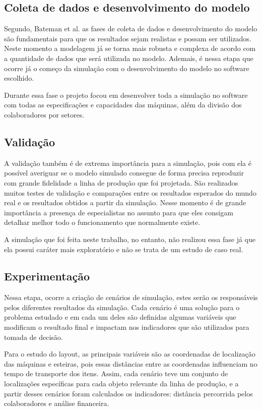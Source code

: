 \documentclass[
	12pt,				%
	openright,			%
	oneside,			%
	a4paper,			%
	english,			%
	french,				%
	spanish,			%
	brazil				%
	]{abntex2}
\begin{document}
\subsection{Coleta de dados e desenvolvimento do modelo}

Segundo, Bateman et al. as fases de coleta de dados e desenvolvimento do modelo são fundamentais para que os resultados sejam realistas e possam ser utilizados. Neste momento a modelagem já se torna mais robusta e complexa de acordo com a quantidade de dados que será utilizada no modelo. Ademais, é nessa etapa que ocorre já o começo da simulação com o desenvolvimento do modelo no software escolhido.

Durante essa fase o projeto focou em desenvolver toda a simulação no software com todas as especificações e capacidades das máquinas, além da divisão dos colaboradores por setores.



\subsection{Validação}

	A validação também é de extrema importância para a simulação, pois com ela é possível averiguar se o modelo simulado consegue de forma precisa reproduzir com grande fidelidade a linha de produção que foi projetada. São realizados muitos testes de validação e comparações entre os resultados esperados do mundo real e os resultados obtidos a partir da simulação. Nesse momento é de grande importância a presença de especialistas no assunto para que eles consigam detalhar melhor todo o funcionamento que normalmente existe.

	A simulação que foi feita neste trabalho, no entanto, não realizou essa fase já que ela possui caráter mais exploratório e não se trata de um estudo de caso real. 

\subsection{Experimentação}

	Nessa etapa, ocorre a criação de cenários de simulação, estes serão os responsáveis pelos diferentes resultados da simulação. Cada cenário é uma solução para o problema estudado e em cada um deles são definidas algumas variáveis que modificam o resultado final e impactam nos indicadores que são utilizados para tomada de decisão.

	Para o estudo do layout, as principais variáveis são as coordenadas de localização das máquinas e esteiras, pois essas distâncias entre as coordenadas influenciam no tempo de transporte dos itens. Assim, cada cenário teve um conjunto de localizações específicas para cada objeto relevante da linha de produção, e a partir desses cenários foram calculados os indicadores: distância percorrida pelos colaboradores e análise financeira. 
\end{document}
